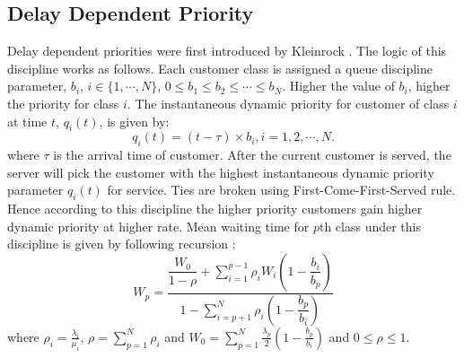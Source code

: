 \documentclass[a4paper,12pt]{article}
\begin{document}
\subsection{Delay Dependent Priority} 
Delay dependent priorities were first introduced by Kleinrock \cite{Kleinrock1964}. The logic of this discipline works as follows. Each customer class is assigned a queue discipline parameter, $b_i$, $i \in \{1, \cdots, N\}$, $0 \le b_1 \le b_2 \le \cdots \le b_N$. Higher the value of $b_i$, higher the priority for class $i$. The instantaneous dynamic priority for customer of class $i$ at time $t$, $q_i(t)$, is given by: 
\begin{equation}
q_i(t) = (t-\tau)\times b_i, i = 1,2, \cdots, N.
\label{ddpinst}
\end{equation}
where $\tau$ is the arrival time of customer. After the current customer is served, the server will pick the customer with the highest instantaneous dynamic priority parameter $q_i(t)$ for service. Ties are broken using First-Come-First-Served rule. Hence according to this discipline the higher priority customers gain higher dynamic priority at higher rate.
Mean waiting time for $p$th class under this discipline is given by following recursion \cite{Kleinrock1964}:
\begin{equation}\label{eqn:DDP_recursion}
W_p = \dfrac{\dfrac{W_0}{1-\rho} + \displaystyle\sum_{i=1}^{p-1} \rho_i W_i\left(1-\dfrac{b_i}{b_p}\right)}{1-\displaystyle\sum_{i=p+1}^{N}\rho_i\left(1-\dfrac{b_p}{b_i}\right)}
\end{equation}
where $\rho_i = \frac{\lambda_i}{\mu_i}$, $\rho = \sum_{p=1}^N\rho_i$ and $W_0 = \sum_{p=1}^N\frac{\lambda_p}{2}\left(1-\frac{b_p}{b_i}\right)$ and $0\leq \rho\le 1$.
\end{document}
